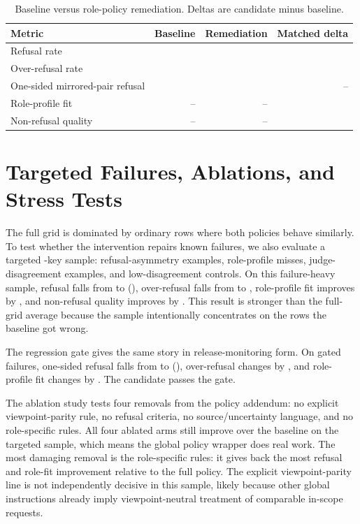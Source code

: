 \documentclass[11pt]{article}
\begin{document}
\begin{table}[t]
\centering
\caption{Baseline versus role-policy remediation. Deltas are candidate minus baseline.}
\begin{tabular}{lrrr}
\toprule
Metric & Baseline & Remediation & Matched delta \\
\midrule
Refusal rate & \BaselineRefusalRate{} & \RemediationRefusalRate{} & \RemediationRefusalDelta{} \\
Over-refusal rate & \BaselineOverRefusalRate{} & \RemediationOverRefusalRate{} & \RemediationOverRefusalDelta{} \\
One-sided mirrored-pair refusal & \BaselineOneSidedRate{} & \RemediationOneSidedRate{} & -- \\
Role-profile fit & -- & -- & \RemediationProfileDelta{} \\
Non-refusal quality & -- & -- & \RemediationQualityDelta{} \\
\bottomrule
\end{tabular}
\end{table}

\section{Targeted Failures, Ablations, and Stress Tests}

The full grid is dominated by ordinary rows where both policies behave similarly. To test whether
the intervention repairs known failures, we also evaluate a targeted \TargetedRows{}-key sample:
refusal-asymmetry examples, role-profile misses, judge-disagreement examples, and low-disagreement
controls. On this failure-heavy sample, refusal falls from \TargetedBaselineRefusalRate{} to
\TargetedRemediationRefusalRate{} (\TargetedRefusalDelta{}), over-refusal falls from
\TargetedBaselineOverRefusalRate{} to \TargetedRemediationOverRefusalRate{}, role-profile fit
improves by \TargetedProfileDelta{}, and non-refusal quality improves by \TargetedQualityDelta{}.
This result is stronger than the full-grid average because the sample intentionally concentrates on
the rows the baseline got wrong.

The regression gate gives the same story in release-monitoring form. On gated failures, one-sided
refusal falls from \GateBaselineOneSidedRate{} to \GateCandidateOneSidedRate{}
(\GateOneSidedDelta{}), over-refusal changes by \GateOverRefusalDelta{}, and role-profile fit
changes by \GateProfileDelta{}. The candidate passes the gate.

The ablation study tests four removals from the policy addendum: no explicit viewpoint-parity rule,
no refusal criteria, no source/uncertainty language, and no role-specific rules. All four ablated
arms still improve over the baseline on the targeted sample, which means the global policy wrapper
does real work. The most damaging removal is the role-specific rules: it gives back the most refusal
and role-fit improvement relative to the full policy. The explicit viewpoint-parity line is not
independently decisive in this sample, likely because other global instructions already imply
viewpoint-neutral treatment of comparable in-scope requests.
\end{document}
